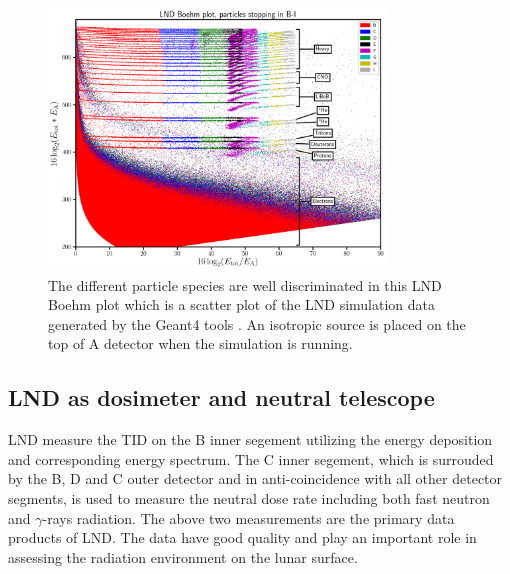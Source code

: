 \begin{figure}
    \centering
    \includegraphics[width=0.8\textwidth]{images/LND_Boehm_plot_isotropic_on_top_of_A_annotated.png}
    \caption[LND Boehm plot of stopping particles based on the simulated data]{The different particle species are well discriminated in this LND Boehm plot which is a scatter plot of the \ac{LND} simulation data generated by the \ac{Geant4} tools \citet{Agostinelli-2003}. An isotropic source is placed on the top of A detector when the simulation is running.}
    \label{Fig:LND-Boehm-plot}
\end{figure}


\subsection{LND as dosimeter and neutral telescope}

\ac{LND} measure the \ac{TID} on the B inner segement utilizing the energy deposition and corresponding energy spectrum. The C inner segement, which is surrouded by the B, D and C outer detector and in anti-coincidence with all other detector segments, is used to measure the neutral dose rate including both fast neutron and $\gamma$-rays radiation. The above two measurements are the primary data products of \ac{LND}. The data have good quality and play an important role in assessing the radiation environment on the lunar surface. 

